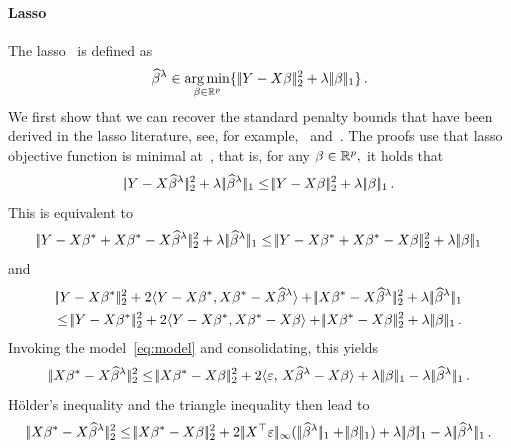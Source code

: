 \documentclass[bj]{imsart}
\newcommand{\normsup}[1]{\ensuremath{\!|\!| #1 | \! |_{\infty}}}
\newcommand{\normone}[1]{\ensuremath{\!|\!| #1 | \! |_{1}}}
\newcommand{\normtwo}[1]{\ensuremath{\!|\!| #1 | \! |_{2}}}
\newcommand{\inprod}[2]{\ensuremath{\langle #1 , \, #2 \rangle}}
\newcommand{\1}{{\rm 1}\mskip -4,5mu{\rm l} }
\newcommand{\argmin}{\mathop{\mathrm{arg\,min}}}
\def\R{\mathbb{R}}
\newcommand{\rp}{\mathbb{R}^p}
\newcommand{\betatrue}{\beta^*}
\newcommand{\genbeta}{\textcolor{black}{\beta}}
\begin{document}
\paragraph{Lasso} The lasso~\cite{Tibshirani96} is defined as
\begin{equation*}
  \estimatort \in \argmin_{\beta\in\rp}\{\,\normtwo{\outcome-\design\beta}^2+\tuningparameter\,\normone{\beta}\}\,.
\end{equation*}
We first show that we can recover the standard penalty bounds that have been derived in the lasso literature, see, for example,~\cite[Eq. (2.3) in Theorem 1]{Kolt10} and~\cite[Equation~(3)]{Hebiri13}. The proofs use that lasso objective function is minimal at~\estimatort, that is, for any $\genbeta\in\R^p,$ it holds that
\begin{equation*}
  \normtwo{\outcome-\design\estimatort}^2+\tuningparameter\,\normone{\estimatort}\leq \normtwo{\outcome-\design\genbeta}^2+\tuningparameter\,\normone{\genbeta}\,.
\end{equation*}
This is equivalent to 
\begin{equation*}
  \normtwo{\outcome-\design\betatrue+\design\betatrue-\design\estimatort}^2+\tuningparameter\,\normone{\estimatort}\leq \normtwo{\outcome-\design\betatrue+\design\betatrue-\design\genbeta}^2+\tuningparameter\,\normone{\genbeta}
\end{equation*}
and
\begin{multline*}
  \normtwo{\outcome-\design\betatrue}^2+2\langle\outcome-\design\betatrue,\design\betatrue-\design\estimatort\rangle+\normtwo{\design\betatrue-\design\estimatort}^2+\tuningparameter\,\normone{\estimatort}\\
\leq \normtwo{\outcome-\design\betatrue}^2+2\langle\outcome-\design\betatrue,\design\betatrue-\design\genbeta\rangle+\normtwo{\design\betatrue-\design\genbeta}^2+\tuningparameter\,\normone{\genbeta}\,.
\end{multline*}
Invoking the model~\eqref{eq:model} and consolidating, this yields
\begin{equation*}
    \normtwo{\design\truth-\design\estimatort}^2\leq \normtwo{\design\betatrue-\design\genbeta}^2+2\inprod{\noise}{\design\estimatort-\design\genbeta}+\tuningparameter\,\normone{\genbeta}-\tuningparameter\,\normone{\estimatort}\,.
\end{equation*}
H\"older's inequality and the triangle inequality then lead to
\begin{equation*}
    \normtwo{\design\truth-\design\estimatort}^2\leq \normtwo{\design\betatrue-\design\genbeta}^2+2\,\normsup{\design^\top\noise}(\,\normone{\estimatort}+\normone{\genbeta})+\tuningparameter\,\normone{\genbeta}-\tuningparameter\,\normone{\estimatort}\,.
\end{equation*}
\end{document}
